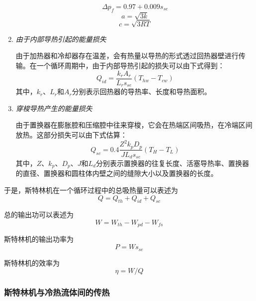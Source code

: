 \begin{enumerate}[label=(\arabic*)]
\begin{equation}
	\Delta p_f = 0.97+0.009s_{se}
\end{equation}
\begin{equation}
	a = \sqrt{3k}
\end{equation}
\begin{equation}
	c = \sqrt{3RT}
\end{equation}

\item \emph{由于内部导热引起的能量损失}

由于加热器和冷却器存在温差，会有热量以导热的形式透过回热器壁进行传输\cite{Strauss2010}。在一个循环周期中，由于内部导热引起的损失可以由下式得到：
\begin{equation}
	Q_{id} = \frac{k_rA_r}{L_rs_{se}}(T_{hw} - T_{cw})
\end{equation}
其中，$k_r$、$L_r$和$A_r$分别表示回热器的导热率、长度和导热面积。

\item \emph{穿梭导热产生的能量损失}

由于置换器在膨胀腔和压缩腔中往来穿梭，它会在热端区间吸热，在冷端区间放热。这部分损失可以由下式估算\cite{Timoumi2008}：
\begin{equation}
	Q_{sc} = 0.4\frac{Z^2k_pD_p}{JL_ds_{se}}(T_{H} - T_{L})
\end{equation}
其中，$Z$、$k_p$、$D_p$、$J$和$L_d$分别表示置换器的往复长度、活塞导热率、置换器的直径、置换器和圆柱体内壁之间的缝隙大小以及置换器的长度。

\end{enumerate}

于是，斯特林机在一个循环过程中的总吸热量可以表述为
\begin{equation}
	Q = Q_{th} + Q_{id} + Q_{sc}
	\label{eq:heat}
\end{equation}

总的输出功可以表述为
\begin{equation}
	W = W_{th} - W_{pd} - W_{fs}
	\label{eq:work}
\end{equation}

斯特林机的输出功率为
\begin{equation}
	P = Ws_{se}
	\label{eq:P}
\end{equation}

斯特林机的效率为
\begin{equation}
	\eta = W/Q
	\label{eq:eta}
\end{equation}

\subsubsection{斯特林机与冷热流体间的传热}

